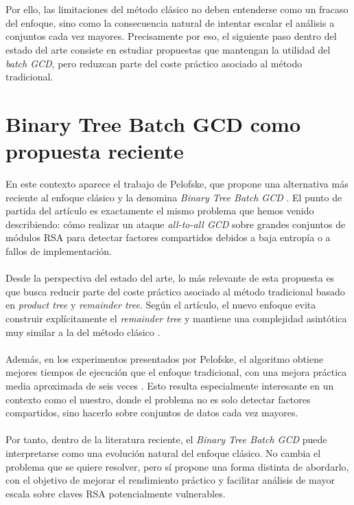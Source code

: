 \\
\\
Por ello, las limitaciones del método clásico no deben entenderse como un fracaso del enfoque, sino como la consecuencia natural de intentar escalar el análisis a conjuntos cada vez mayores. Precisamente por eso, el siguiente paso dentro del estado del arte consiste en estudiar propuestas que mantengan la utilidad del \textit{batch GCD}, pero reduzcan parte del coste práctico asociado al método tradicional.

\section{Binary Tree Batch GCD como propuesta reciente}

En este contexto aparece el trabajo de Pelofske, que propone una alternativa más reciente al enfoque clásico y la denomina \textit{Binary Tree Batch GCD} \cite{pelofske2024efficient}. El punto de partida del artículo es exactamente el mismo problema que hemos venido describiendo: cómo realizar un ataque \textit{all-to-all GCD} sobre grandes conjuntos de módulos RSA para detectar factores compartidos debidos a baja entropía o a fallos de implementación.
\\
\\
Desde la perspectiva del estado del arte, lo más relevante de esta propuesta es que busca reducir parte del coste práctico asociado al método tradicional basado en \textit{product tree} y \textit{remainder tree}. Según el artículo, el nuevo enfoque evita construir explícitamente el \textit{remainder tree} y mantiene una complejidad asintótica muy similar a la del método clásico \cite{pelofske2024efficient}.
\\
\\
Además, en los experimentos presentados por Pelofske, el algoritmo obtiene mejores tiempos de ejecución que el enfoque tradicional, con una mejora práctica media aproximada de seis veces \cite{pelofske2024efficient}. Esto resulta especialmente interesante en un contexto como el nuestro, donde el problema no es solo detectar factores compartidos, sino hacerlo sobre conjuntos de datos cada vez mayores.
\\
\\
Por tanto, dentro de la literatura reciente, el \textit{Binary Tree Batch GCD} puede interpretarse como una evolución natural del enfoque clásico. No cambia el problema que se quiere resolver, pero sí propone una forma distinta de abordarlo, con el objetivo de mejorar el rendimiento práctico y facilitar análisis de mayor escala sobre claves RSA potencialmente vulnerables.


